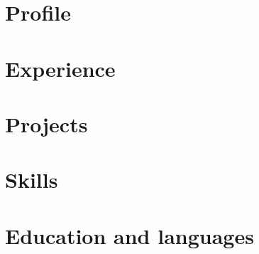 \documentclass[a4paper,10pt]{article}
\begin{document}


\section*{Profile}


\section*{Experience}
\begin{cvexperience}


\end{cvexperience}

\section*{Projects}
\begin{cvblock}


\end{cvblock}

\section*{Skills}
\begin{cvcompact}

\end{cvcompact}

\section*{Education and languages}
\begin{cvcompact}


\end{cvcompact}
\end{document}
